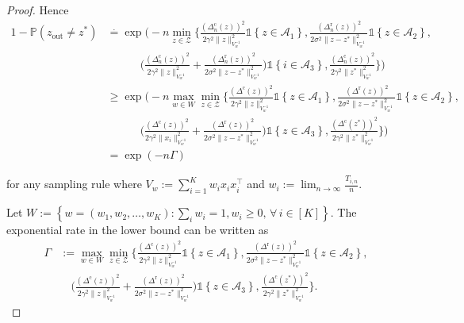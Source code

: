 \documentclass[accepted]{uai2025} %
\theoremstyle{plain}
\theoremstyle{definition}
\theoremstyle{remark}
\newcommand{\Deltac}{\Delta^{\mathrm{c}}}
\newcommand{\Deltar}{\Delta^{\mathrm{r}}}
\newcommand{\PP}{\mathbb{P}} %
\newcommand{\cbr}[1]{\left\{#1\right\}}
\newcommand*{\one}{\mathds{1}}
\begin{document}
\begin{proof}
Hence 
\begin{align*}
    1-\PP(z_{\text{out}}\neq z^*) & \stackrel{\cdot}{=} \exp \bigg(-n \min_{z\in\mathcal{Z}} \bigg\{ \frac{(\Deltac_n(z))^2}{2\gamma^2\lVert z\rVert^2_{V_w^{-1}}} \one \cbr{z\in \mathcal{A}_1}, 
      \frac{(\Deltar_n(z))^2}{2\sigma^2\lVert z-z^*\rVert^2_{V_w^{-1}}} \one \cbr{z\in \mathcal{A}_2}, 
    \\& \qquad\quad \bigg( \frac{(\Deltac_n(z))^2}{2\gamma^2\lVert z\rVert^2_{V_w^{-1}}}+\frac{(\Deltar_n(z))^2}{2\sigma^2\lVert z-z^*\rVert^2_{V_w^{-1}}}\bigg) \one \cbr{i\in \mathcal{A}_3} ,
     \frac{(\Deltac_n(z))^2}{2\gamma^2\lVert z^*\rVert^2_{V_w^{-1}}}
    \bigg\}
    \bigg)
    \\&\ge \exp \bigg(-n \max_{w\in W}\min_{z\in \mathcal{Z}} \bigg\{ \frac{(\Deltac(z))^2}{2\gamma^2\lVert z\rVert^2_{V_w^{-1}}} \one \cbr{z\in \mathcal{A}_1}, 
    \frac{(\Deltar(z))^2}{2\sigma^2\lVert z-z^*\rVert^2_{V_w^{-1}}} \one \cbr{z\in \mathcal{A}_2}, 
    \\& \qquad\quad \bigg( \frac{(\Deltac(z))^2}{2\gamma^2\lVert x_i\rVert^2_{V_w^{-1}}}+\frac{(\Deltar(z))^2}{2\sigma^2\lVert z-z^*\rVert^2_{V_w^{-1}}}\bigg) \one \cbr{z\in \mathcal{A}_3},
      \frac{(\Deltac(z^*))^2}{2\gamma^2\lVert z^*\rVert^2_{V_w^{-1}}}\bigg\}
    \bigg)
    \\&=\exp(-n\Gamma)
\end{align*}







for any sampling rule where $V_w:=\sum_{i=1}^K w_{i} x_i x_i^{\top}$ and $w_i:=\lim_{n\rightarrow \infty}\frac{T_{i,n}}{n}$.

Let $W:=\cbr{w=(w_1, w_2, \ldots, w_K): \sum_i w_i=1, w_i\ge0 ,\, \forall\, i\in [K]}$. The exponential rate in the lower bound can be written as
\begin{align*}
    \Gamma&:= \max_{w\in W}\min_{z\in \mathcal{Z}} \bigg\{ \frac{(\Deltac(z))^2}{2\gamma^2\lVert z\rVert^2_{V_w^{-1}}} \one \cbr{z\in \mathcal{A}_1}, 
    \frac{(\Deltar(z))^2}{2\sigma^2\lVert z-z^* \rVert^2_{V_w^{-1}}} \one \cbr{z\in \mathcal{A}_2}, 
    \\& \quad \bigg( \frac{(\Deltac(z))^2}{2\gamma^2\lVert z\rVert^2_{V_w^{-1}}}+\frac{(\Deltar(z))^2}{2\sigma^2\lVert z-z^*\rVert^2_{V_w^{-1}}}\bigg) \one \cbr{z\in \mathcal{A}_3},
   \frac{(\Deltac(z^*))^2}{2\gamma^2\lVert z^*\rVert^2_{V_w^{-1}}}\bigg\}.
\end{align*}
\end{proof}
\end{document}
